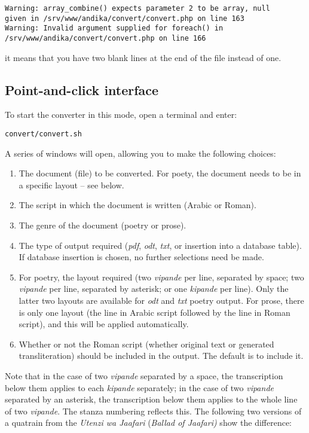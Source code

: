 \verb|Warning: array_combine() expects parameter 2 to be array, null|\\
\verb|given in /srv/www/andika/convert/convert.php on line 163|\\
\verb|Warning: Invalid argument supplied for foreach() in /srv/www/andika/convert/convert.php on line 166|

it means that you have two blank lines at the end of the file instead of one.

\subsection{Point-and-click interface}
\label{ss:pacint}

To start the converter in this mode, open a terminal and enter:

\verb|convert/convert.sh|

A series of windows will open, allowing you to make the following choices:
\begin{enumerate}
\item The document (file) to be converted.  For poety, the document needs to be in a specific layout -- see  below.
\item The script in which the document is written (Arabic or Roman).
\item The genre of the document (poetry or prose).
\item The type of output required (\textit{pdf}, \textit{odt}, \textit{txt}, or insertion into a database table).  If database insertion is chosen, no further selections need be made.
\item For poetry, the layout required (two \textit{vipande} per line, separated by space; two \textit{vipande} per line, separated by asterisk; or one \textit{kipande} per line).  Only the latter two layouts are available for \textit{odt} and \textit{txt} poetry output.  For prose, there is only one layout (the line in Arabic script followed by the line in Roman script), and this will be applied automatically.
\item Whether or not the Roman script (whether original text or generated transliteration) should be included in the output.  The default is to include it.  
\end{enumerate}

Note that in the case of two \textit{vipande} separated by a space, the transcription below them applies to each \textit{kipande} separately; in the case of two \textit{vipande} separated by an asterisk, the transcription below them applies to the whole line of two \textit{vipande}.  The stanza numbering reflects this.  The following two versions of a quatrain from the \textit{Utenzi wa Jaafari}  (\textit{Ballad of Jaafari)} show the difference:

